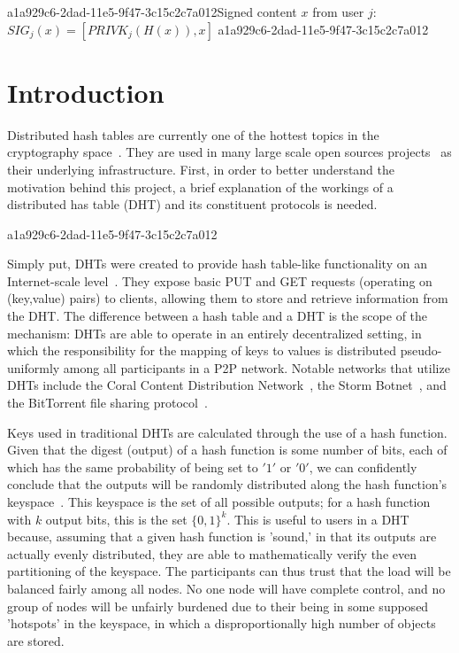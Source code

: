 \documentclass[12pt]{article}
\begin{document}
a1a929c6-2dad-11e5-9f47-3c15c2c7a012Signed content $x$ from user $j$: $SIG_j(x) = \left[ PRIVK_j( H(x) ), x \right]$
a1a929c6-2dad-11e5-9f47-3c15c2c7a012
\section{Introduction}
\par Distributed hash tables are currently one of the hottest topics in the cryptography space~\cite{Stoica:2001dj,Rowstron:2001ea,Ratnasamy:2001wn}. They are used in many large scale open sources projects~\cite{Freitas:2013tb,Xu:2010vs,Perfitt:2010fh} as their underlying infrastructure. First, in order to better understand the motivation behind this project, a brief explanation of the workings of a distributed has table (DHT) and its constituent protocols is needed.

a1a929c6-2dad-11e5-9f47-3c15c2c7a012\par Simply put, DHTs were created to provide hash table-like functionality on an Internet-scale level~\cite{Ratnasamy:2001wn}. They expose basic PUT and GET requests (operating on (key,value) pairs) to clients, allowing them to store and retrieve information from the DHT. The difference between a hash table and a DHT is the scope of the mechanism: DHTs are able to operate in an entirely decentralized setting, in which the responsibility for the mapping of keys to values is distributed pseudo-uniformly among all participants in a P2P network. Notable networks that utilize DHTs include the Coral Content Distribution Network~\cite{Freedman:2004vb}, the Storm Botnet~\cite{Holz:2008uk}, and the BitTorrent file sharing protocol~\cite{Cohen:y1_8mBnw}.

\par Keys used in traditional DHTs are calculated through the use of a hash function. Given that the digest (output) of a hash function is some number of bits, each of which has the same probability of being set to $'1'$ or $'0'$, we can confidently conclude that the outputs will be randomly distributed along the hash function's keyspace~. This keyspace is the set of all possible outputs; for a hash function with $k$ output bits, this is the set $\{0,1\}^k$. This is useful to users in a DHT because, assuming that a given hash function is 'sound,' in that its outputs are actually evenly distributed, they are able to mathematically verify the even partitioning of the keyspace. The participants can thus trust that the load will be balanced fairly among all nodes. No one node will have complete control, and no group of nodes will be unfairly burdened due to their being in some supposed 'hotspots' in the keyspace, in which a disproportionally high number of objects are stored.~
\end{document}
